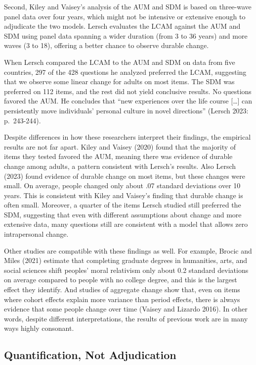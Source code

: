 \documentclass[
  12pt,
]{article}
\begin{document}
Second, Kiley and Vaisey's analysis of the AUM and SDM is based on
three-wave panel data over four years, which might not be intensive or
extensive enough to adjudicate the two models. Lersch evaluates the LCAM
against the AUM and SDM using panel data spanning a wider duration (from
3 to 36 years) and more waves (3 to 18), offering a better chance to
observe durable change.

When Lersch compared the LCAM to the AUM and SDM on data from five
countries, 297 of the 428 questions he analyzed preferred the LCAM,
suggesting that we observe some linear change for adults on most items.
The SDM was preferred on 112 items, and the rest did not yield
conclusive results. No questions favored the AUM. He concludes that
``new experiences over the life course {[}\ldots{]} can persistently
move individuals' personal culture in novel directions'' (Lersch 2023:
p.~243-244).

Despite differences in how these researchers interpret their findings,
the empirical results are not far apart. Kiley and Vaisey (2020) found
that the majority of items they tested favored the AUM, meaning there
was evidence of durable change among adults, a pattern consistent with
Lersch's results. Also Lersch (2023) found evidence of durable change on
most items, but these changes were small. On average, people changed
only about .07 standard deviations over 10 years. This is consistent
with Kiley and Vaisey's finding that durable change is often small.
Moreover, a quarter of the items Lersch studied still preferred the SDM,
suggesting that even with different assumptions about change and more
extensive data, many questions still are consistent with a model that
allows zero intrapersonal change.

Other studies are compatible with these findings as well. For example,
Brocic and Miles (2021) estimate that completing graduate degrees in
humanities, arts, and social sciences shift peoples' moral relativism
only about 0.2 standard deviations on average compared to people with no
college degree, and this is the largest effect they identify. And
studies of aggregate change show that, even on items where cohort
effects explain more variance than period effects, there is always
evidence that some people change over time (Vaisey and Lizardo 2016). In
other words, despite different interpretations, the results of previous
work are in many ways highly consonant.

\hypertarget{quantification-not-adjudication}{%
\subsection{Quantification, Not
Adjudication}\label{quantification-not-adjudication}}
\end{document}
